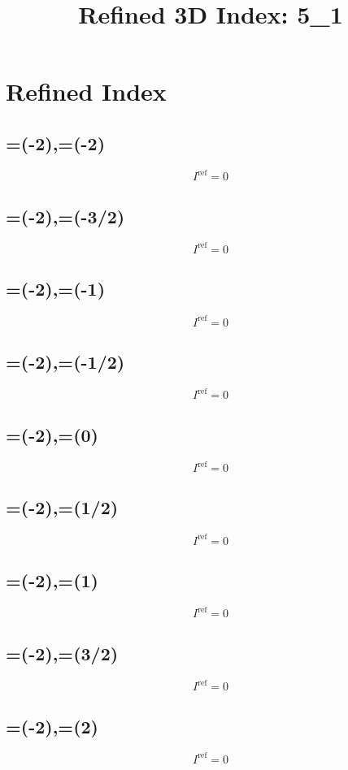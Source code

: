 \documentclass[11pt,a4paper]{article}
\newcommand{\Iref}{I^{\mathrm{ref}}}
\begin{document}
\title{Refined 3D Index: 5_1}
\maketitle
\section{Refined Index}
\subsection{=(-2),\;=(-2)}
\[ \Iref = 0 \]

\subsection{=(-2),\;=(-3/2)}
\[ \Iref = 0 \]

\subsection{=(-2),\;=(-1)}
\[ \Iref = 0 \]

\subsection{=(-2),\;=(-1/2)}
\[ \Iref = 0 \]

\subsection{=(-2),\;=(0)}
\[ \Iref = 0 \]

\subsection{=(-2),\;=(1/2)}
\[ \Iref = 0 \]

\subsection{=(-2),\;=(1)}
\[ \Iref = 0 \]

\subsection{=(-2),\;=(3/2)}
\[ \Iref = 0 \]

\subsection{=(-2),\;=(2)}
\[ \Iref = 0 \]
\end{document}
